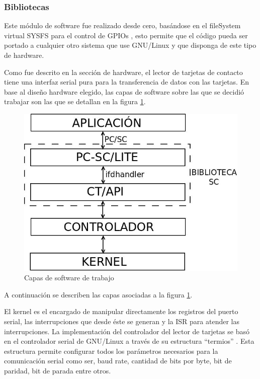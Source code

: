 \documentclass[%
        final,
        notitlepage,
        narroweqnarray,
        inline,
        ]{ieee}
\begin{document}
\subsubsection{Bibliotecas}


Este módulo de software fue realizado desde cero, basándose en el fileSystem virtual SYSFS para el control de GPIOs \cite{gpio} \cite{gpioK}, esto permite que el código pueda ser portado a cualquier otro sistema que use GNU/Linux y que disponga de este tipo de hardware.

\bigskip
{}

Como fue descrito en la sección de hardware, el lector de tarjetas de contacto tiene una interfaz serial pura para la transferencia de datos con las tarjetas. En base al diseño hardware elegido, las capas de software sobre las que se decidió trabajar son las que se detallan en la figura \ref{Fig:capas}. 

\begin{figure}[h]
\centering
  \begin{center}
  \includegraphics[scale=.35]{../docs/Imagenes/SW_sc1.jpg} 
  \end{center}
  \caption{Capas de software de trabajo}\label{Fig:capas} 
\end{figure}


A continuación se describen las capas asociadas a la figura \ref{Fig:capas}.

\newpage
{}
El kernel es el encargado de manipular directamente los registros del puerto serial, las interrupciones que desde éste se generan y la ISR para atender las interrupciones.
La implementación del controlador del lector de tarjetas se basó en el controlador serial de GNU/Linux a través de su estructura “termios” \cite{termios}. Esta estructura permite configurar todos los parámetros necesarios para la comunicación serial como ser, baud rate, cantidad de bits por byte, bit de paridad, bit de parada entre otros. \\
\end{document}
